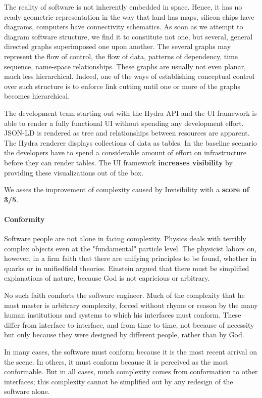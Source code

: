The reality of software is not inherently embedded in space. Hence, it has no ready geometric representation in the way that land has maps, silicon chips have diagrams, computers have connectivity schematics. As soon as we attempt to diagram software structure, we find it to constitute not one, but several, general directed graphs superimposed one upon another. The several graphs may represent the flow of control, the flow of data, patterns of dependency, time sequence, name-space relationships. These graphs are usually not even planar, much less hierarchical. Indeed, one of the ways of establishing conceptual control over such structure is to enforce link cutting until one or more of the graphs becomes hierarchical. \citep{nosilverbullet}

The development team starting out with the Hydra API and the UI framework is able to render a fully functional UI without spending any development effort. JSON-LD is rendered as tree and relationships between resources are apparent. The Hydra renderer displays collections of data as tables. In the baseline scenario the developers have to spend a considerable amount of effort on infrastructure before they can render tables. The UI framework \textbf{increases visibility} by providing these visualizations out of the box.

We asses the improvement of complexity caused by Invisibility with a \textbf{score of 3/5}.

\paragraph{Conformity}
Software people are not alone in facing complexity. Physics deals with terribly complex objects even at the "fundamental" particle level. The physicist labors on, however, in a firm faith that there are unifying principles to be found, whether in quarks or in unifiedfield theories. Einstein argued that there must be simplified explanations of nature, because God is not capricious or arbitrary.

No such faith comforts the software engineer. Much of the complexity that he must master is arbitrary complexity, forced without rhyme or reason by the many human institutions and systems to which his interfaces must conform. These differ from interface to interface, and from time to time, not because of necessity but only because they were designed by different people, rather than by God.

In many cases, the software must conform because it is the most recent arrival on the scene. In others, it must conform because it is perceived as the most conformable. But in all cases, much complexity comes from conformation to other interfaces; this complexity cannot be simplified out by any redesign of the software alone. \citep{nosilverbullet}

